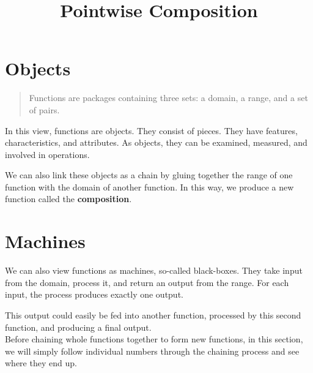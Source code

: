 \documentclass{ximera}
\title{Pointwise Composition}
\begin{document}
\begin{abstract}
\end{abstract}
\maketitle



\section*{Objects}


\begin{quote}
Functions are packages containing three sets: a domain, a range, and a set of pairs.
\end{quote}

In this view, functions are objects.  They consist of pieces. They have features, characteristics, and attributes.  As objects, they can be examined, measured, and involved in operations.


We can also link these objects as a chain by gluing together the range of one function with the domain of another function.  In this way, we produce a new function called the \textbf{composition}.












\section*{Machines}



We can also view functions as machines, so-called black-boxes.  They take input from the domain, process it, and return an output from the range.  For each input, the process produces exactly one output.



This output could easily be fed into another function, processed by this second function, and producing a final output. \\



Before chaining whole functions together to form new functions, in this section, we will simply follow individual numbers through the chaining process and see where they end up.
\end{document}

